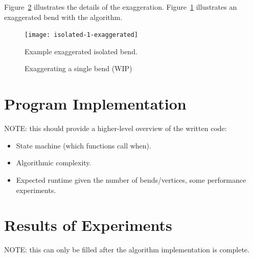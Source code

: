 \documentclass[a4paper]{article}
\begin{document}
Figure~\ref{fig:exaggerating-a-single-bend} illustrates the details of the
exaggeration. Figure~\ref{fig:isolated-1-exaggerated} illustrates an
exaggerated bend with the algorithm.

\begin{figure}[ht]
    \centering
    \texttt{[image: isolated-1-exaggerated]}
    \caption{Example exaggerated isolated bend.}
    \label{fig:isolated-1-exaggerated}
\end{figure}

\begin{figure}[!ht]
  \centering
  \caption{Exaggerating a single bend (WIP)}
  \label{fig:exaggerating-a-single-bend}
\end{figure}


\section{Program Implementation}


NOTE: this should provide a higher-level overview of the written code:

\begin{itemize}
    \item State machine (which functions call when).
    \item Algorithmic complexity.
    \item Expected runtime given the number of bends/vertices, some performance
        experiments.
\end{itemize}

\section{Results of Experiments}

NOTE: this can only be filled after the algorithm implementation is complete.


\end{document}
